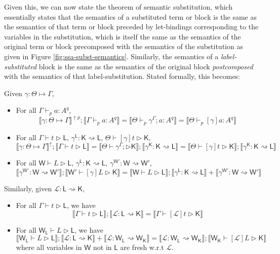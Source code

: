 \documentclass[acmsmall,screen,review]{acmart}
\newcommand{\mc}[1]{\ensuremath{\mathcal{#1}}}
\newcommand{\ms}[1]{\ensuremath{\mathsf{#1}}}
\newcommand{\hasty}[5]{#1 \vdash_{#2} #3: {#4}^{#5}}
\newcommand{\haslb}[3]{#1 \vdash #2 \rhd #3}
\newcommand{\lhaslb}[3]{#1 \vdash #2 \rhd #3}
\newcommand{\issubst}[3]{#1: #2 \mapsto #3}
\newcommand{\lbsubst}[3]{#1: #2 \rightsquigarrow #3}
\newcommand{\exprletsubst}[2]{{#1};{#2}}
\newcommand{\substctx}[2]{{#1}^{#2}}
\newcommand{\substlbs}[2]{{#1}^{#2}}
\newcommand{\dnt}[1]{\llbracket{#1}\rrbracket}
\newcommand{\upg}[2]{{#1}^{\uparrow #2}}
\begin{document}
Given this, we can now state the theorem of semantic substitution, which
essentially states that the semantics of a substituted term or block is the same
as the semantics of that term or block preceded by let-bindings corresponding to
the variables in the substitution, which is itself the same as the semantics of
the original term or block precomposed with the semantics of the substitution as
given in Figure \ref{fig:ssa-subst-semantics}. Similarly, the semantics of a
\textit{label-substituted} block is the same as the semantics of the original
block \textit{postcomposed} with the semantics of that label-substitution.
Stated formally, this becomes:
\begin{theorem} 
  Given \(\issubst{\gamma}{\Theta}{\Gamma}\),
  \begin{itemize}
    \item For all \(\hasty{\Gamma}{p}{a}{A}{q}\), 
    \[
      \upg{\dnt{\issubst{\gamma}{\Theta}{\Gamma}}}{p}
      ;\dnt{\hasty{\Gamma}{p}{a}{A}{q}} 
      = \dnt{\hasty{\Theta}{p}{\exprletsubst{\substctx{\gamma}{\Gamma}}{a}}{A}{q}}
      = \dnt{\hasty{\Theta}{p}{[\gamma]a}{A}{q}}
    \]
    \item For all 
      \(\haslb{\Gamma}{t}{\ms{L}}\), 
      \(\lbsubst{\substlbs{\gamma}{\ms{L}}}{\ms{K}}{\ms{L}}\), 
      \(\haslb{\Theta}{[\gamma]t}{\ms{K}}\),
    \[
      \upg{\dnt{\issubst{\gamma}{\Theta}{\Gamma}}}{}
      ; \dnt{\haslb{\Gamma}{t}{\ms{L}}}
      = \dnt{\haslb{\Theta}{\exprletsubst{\substctx{\gamma}{\Gamma}}}{\ms{K}}} 
      ; \dnt{\lbsubst{\substlbs{\gamma}{\ms{K}}}{\ms{K}}{\ms{L}}}
      = \dnt{\haslb{\Theta}{[\gamma]t}{\ms{K}}} 
      ; \dnt{\lbsubst{\substlbs{\gamma}{\ms{K}}}{\ms{K}}{\ms{L}}}
    \]
    \item For all 
      \(\lhaslb{\ms{W}}{L}{\ms{L}}\), 
      \(\lbsubst{\substlbs{\gamma}{\ms{L}}}{\ms{K}}{\ms{L}}\),
      \(\lbsubst{\substlbs{\gamma}{\ms{W'}}}{\ms{W}}{\ms{W'}}\),
      \[
        \dnt{\lbsubst{\substlbs{\gamma}{\ms{W'}}}{\ms{W}}{\ms{W'}}}
        ; \dnt{\lhaslb{\ms{W'}}{[\gamma]L}{\ms{K}}}
        = \dnt{\lhaslb{\ms{W}}{L}{\ms{L}}}
        ; \dnt{\lbsubst{\substlbs{\gamma}{\ms{L}}}{\ms{K}}{\ms{L}}}
        + \dnt{\lbsubst{\substlbs{\gamma}{\ms{W'}}}{\ms{W}}{\ms{W'}}}
      \]
  \end{itemize}  
  Similarly, given \(\lbsubst{\mc{L}}{\ms{L}}{\ms{K}}\),
  \begin{itemize} 
    \item For all \(\haslb{\Gamma}{t}{\ms{L}}\), we have
    \[
      \dnt{\haslb{\Gamma}{t}{\ms{L}}};\dnt{\lbsubst{\mc{L}}{\ms{L}}{\ms{K}}}
      = \dnt{\haslb{\Gamma}{[\mc{L}]t}{\ms{K}}}
    \]
    \item For all \(\lhaslb{\ms{W}_{\ms{L}}}{L}{\ms{L}}\), we have
    \[
      \dnt{\lhaslb{\ms{W}_{\ms{L}}}{L}{\ms{L}}};\dnt{\lbsubst{\mc{L}}{\ms{L}}{\ms{K}}}
      + \dnt{\lbsubst{\mc{L}}{\ms{W}_{\ms{L}}}{\ms{W}_{\ms{K}}}}
      = \dnt{\lbsubst{\mc{L}}{\ms{W}_{\ms{L}}}{\ms{W}_{\ms{K}}}};\dnt{\lhaslb{\ms{W}_{\ms{K}}}{[\mc{L}]L}{\ms{K}}}
    \]
    where all variables in \(\ms{W}\) not in \(\ms{L}\) are fresh w.r.t \(\mc{L}\).
  \end{itemize}
\end{theorem}
\end{document}
